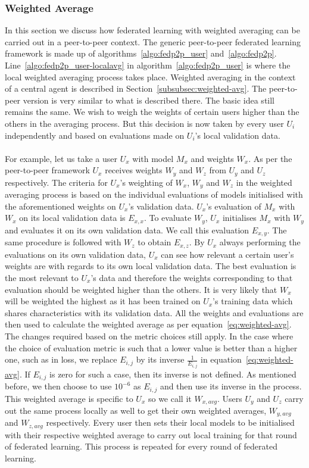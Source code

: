 \documentclass[12pt]{article}
\begin{document}
\subsubsection{Weighted Average}
In this section we discuss how federated learning with weighted averaging can be carried out in a peer-to-peer context. The generic peer-to-peer federated learning framework is made up of algorithms~\ref{algo:fedp2p_user} and~\ref{algo:fedp2p}. Line~\ref{algo:fedp2p_user-localavg} in algorithm~\ref{algo:fedp2p_user} is where the local weighted averaging process takes place. Weighted averaging in the context of a central agent is described in Section~\ref{subsubsec:weighted-avg}. The peer-to-peer version is very similar to what is described there. The basic idea still remains the same. We wish to weigh the weights of certain users higher than the others in the averaging process. But this decision is now taken by every user $U_i$ independently and based on evaluations made on $U_i$'s local validation data.
\\\\
For example, let us take a user $U_x$ with model $M_x$ and weights $W_x$. As per the peer-to-peer framework $U_x$ receives weights $W_y$ and $W_z$ from $U_y$ and $U_z$ respectively. The criteria for $U_x$'s weighting of $W_x$, $W_y$ and $W_z$ in the weighted averaging process is based on the individual evaluations of models initialised with the aforementioned weights on $U_x$'s validation data. $U_x$'s evaluation of $M_x$ with $W_x$ on its local validation data is $E_{x,x}$. To evaluate $W_y$, $U_x$ initialises $M_x$ with $W_y$ and evaluates it on its own validation data. We call this evaluation $E_{x,y}$. The same procedure is followed with $W_z$ to obtain $E_{x,z}$. By $U_x$ always performing the evaluations on its own validation data, $U_x$ can see how relevant a certain user's weights are with regards to its own local validation data. The best evaluation is the most relevant to $U_x$'s data and therefore the weights corresponding to that evaluation should be weighted higher than the others. It is very likely that $W_x$ will be weighted the highest as it has been trained on $U_x$'s training data which shares characteristics with its validation data. All the weights and evaluations are then used to calculate the weighted average as per equation~\ref{eq:weighted-avg}. The changes required based on the metric choices still apply. In the case where the choice of evaluation metric is such that a lower value is better than a higher one, such as in loss, we replace $E_{i,j}$ by its inverse $\frac{1}{E_{i,j}}$ in equation~\ref{eq:weighted-avg}. If $E_{i,j}$ is zero for such a case, then its inverse is not defined. As mentioned before, we then choose to use $10^{-6}$ as $E_{i,j}$ and then use its inverse in the process. This weighted average is specific to $U_x$ so we call it $W_{x, avg}$. Users $U_y$ and $U_z$ carry out the same process locally as well to get their own weighted averages, $W_{y, avg}$ and $W_{z, avg}$ respectively. Every user then sets their local models to be initialised with their respective weighted average to carry out local training for that round of federated learning. This process is repeated for every round of federated learning.
\end{document}
